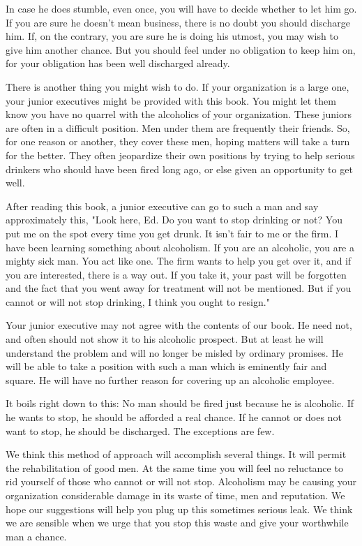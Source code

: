 \begin{biblechapter}
In case he does stumble, even once, you will have to decide whether to let him go.  If you are sure he doesn't mean business, there is no doubt you should discharge him.  If, on the contrary, you are sure he is doing his utmost, you may wish to give him another chance.  But you should feel under no obligation to keep him on, for your obligation has been well discharged already.

There is another thing you might wish to do.  If your organization is a large one, your junior executives might be provided with this book.  You might let them know you have no quarrel with the alcoholics of your organization.  These juniors are often in a difficult position.  Men under them are frequently their friends.  So, for one reason or another, they cover these men, hoping matters will take a turn for the better.  They often jeopardize their own positions by trying to help serious drinkers who should have been fired long ago, or else given an opportunity to get well.

After reading this book, a junior executive can go to such a man and say approximately this, "Look here, Ed.  Do you want to stop drinking or not?  You put me on the spot every time you get drunk.  It isn't fair to me or the firm.  I have been learning something about alcoholism.  If you are an alcoholic, you are a mighty sick man.  You act like one.  The firm wants to help you get over it, and if you are interested, there is a way out.  If you take it, your past will be forgotten and the fact that you went away for treatment will not be mentioned.  But if you cannot or will not stop drinking, I think you ought to resign."

Your junior executive may not agree with the contents of our book.  He need not, and often should not show it to his alcoholic prospect.  But at least he will understand the problem and will no longer be misled by ordinary promises.  He will be able to take a position with such a man which is eminently fair and square.  He will have no further reason for covering up an alcoholic employee.

It boils right down to this:  No man should be fired just because he is alcoholic.  If he wants to stop, he should be afforded a real chance.  If he cannot or does not want to stop, he should be discharged.  The exceptions are few.

We think this method of approach will accomplish several things.  It will permit the rehabilitation of good men.  At the same time you will feel no reluctance to rid yourself of those who cannot or will not stop.  Alcoholism may be causing your organization considerable damage in its waste of time, men and reputation.  We hope our suggestions will help you plug up this sometimes serious leak.  We think we are sensible when we urge that you stop this waste and give your worthwhile man a chance.


\end{biblechapter}
